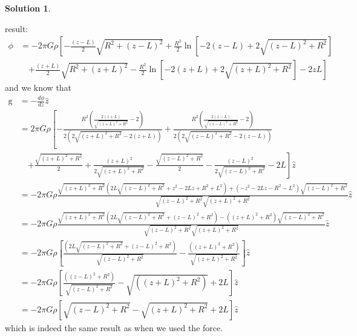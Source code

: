 \documentclass[10pt]{article}
\theoremstyle{definition}
\newtheorem{soln}{Solution}
\newcommand{\uz}{\hat{z}}
\newcommand{\bv}[1]{\bm{\mathrm{#1}}}
\begin{document}
\begin{soln}
\begin{enumerate}[label=(\alph*)]
          result:
          \begin{align*}
            \phi & =-2\pi G\rho
            \left[
              -\frac{(z-L)}{2}\sqrt{R^2+(z-L)^2}+\frac{R^2}{2}\ln\left[-2(z-L)+2\sqrt{(z-L)^2+R^2}\right]\right.\\
              &\quad\left.+\frac{(z+L)}{2}\sqrt{R^2+(z+L)^2}-\frac{R^2}{2}\ln\left[-2(z+L)+2\sqrt{(z+L)^2+R^2}\right]-2zL
            \right]                                                                            
          \end{align*}
          and we know that 
          \begin{align*}
            \bv{g}&=-\frac{d\phi}{dz}\uz\\
            &=2\pi G\rho\left[-\frac{R^{2} \left(\frac{2 \left(z + L\right)}{\sqrt{\left(z + L\right)^{2} + R^{2}}} - 2\right)}{2 \left(2 \sqrt{\left(z + L\right)^{2} + R^{2}} - 2 \left(z + L\right)\right)} + \frac{R^{2} \left(\frac{2 \left(z - L\right)}{\sqrt{\left(z - L\right)^{2} + R^{2}}} - 2\right)}{2 \left(2 \sqrt{\left(z - L\right)^{2} + R^{2}} - 2 \left(z - L\right)\right)}\right.\\
             &\quad\left.+ \frac{\sqrt{\left(z + L\right)^{2} + R^{2}}}{2} + \frac{\left(z + L\right)^{2}}{2 \sqrt{\left(z + L\right)^{2} + R^{2}}} - \frac{\sqrt{\left(z - L\right)^{2} + R^{2}}}{2} - \frac{\left(z - L\right)^{2}}{2 \sqrt{\left(z - L\right)^{2} + R^{2}}} - 2L\right]\uz\\
             &=-2\pi G\rho\frac{\sqrt{\left(z + L\right)^{2} + R^{2}} \left(2L \sqrt{\left(z - L\right)^{2} + R^{2}} + z^{2} - 2Lz + R^{2} + L^{2}\right) + \left(-z^{2} - 2Lz - R^{2} - L^{2}\right) \sqrt{\left(z - L\right)^{2} + R^{2}}}{\sqrt{\left(z - L\right)^{2} + R^{2}} \sqrt{\left(z + L\right)^{2} + R^{2}}}\uz\\
             &=-2\pi G\rho\frac{\sqrt{\left(z + L\right)^{2} + R^{2}} \left(2L \sqrt{\left(z - L\right)^{2} + R^{2}} + (z-L)^2 + R^{2} \right) -\left((z+L)^2 + R^{2}\right) \sqrt{\left(z - L\right)^{2} + R^{2}}}{\sqrt{\left(z - L\right)^{2} + R^{2}} \sqrt{\left(z + L\right)^{2} + R^{2}}}\uz\\
             &=-2\pi G\rho\left[\frac{\left(2L \sqrt{\left(z - L\right)^{2} + R^{2}} + (z-L)^2 + R^{2} \right)}{\sqrt{\left(z - L\right)^{2} + R^{2}}}-\frac{\left((z+L)^2 + R^{2}\right)}{ \sqrt{\left(z + L\right)^{2} + R^{2}}}\right]\uz\\
             &=-2\pi G\rho\left[\frac{\left((z-L)^2 + R^{2} \right)}{\sqrt{\left(z - L\right)^{2} + R^{2}}}-\sqrt{\left((z+L)^2 + R^{2}\right)}+2L\right]\uz\\
             &=-2\pi G\rho\left[\sqrt{\left(z - L\right)^{2} + R^{2}}-\sqrt{(z+L)^2 + R^{2}}+2L\right]\uz
          \end{align*}
          which is indeed the same result as when we used the force.
  \end{enumerate}
\end{soln}
\end{document}
